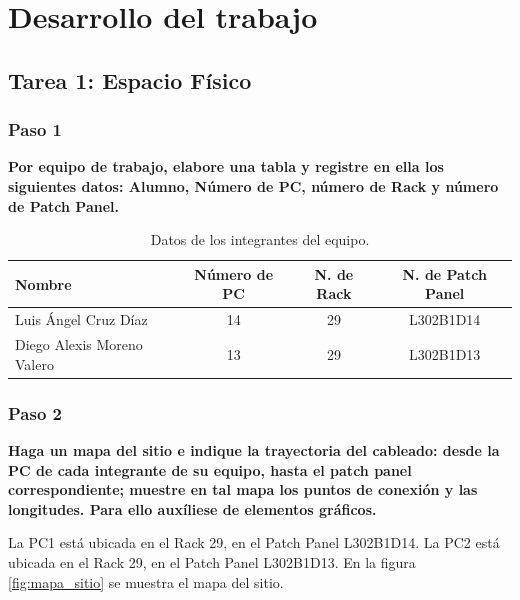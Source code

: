     \newpage
\section{Desarrollo del trabajo}
    \subsection{Tarea 1: Espacio Físico}
        \subsubsection*{Paso 1}
        \textbf{Por equipo de trabajo, elabore una tabla y registre en ella los siguientes datos: Alumno, Número
        de PC, número de Rack y número de Patch Panel.}

        \begin{table}[H]
            \begin{center}
                \begin{tabular}{ l | c | c | c }
                    \textbf{Nombre} & \textbf{Número de PC} & \textbf{N. de Rack} & \textbf{N. de Patch Panel}\\ \hline
                    Luis Ángel Cruz Díaz & 14 & 29 & L302B1D14\\
                    Diego Alexis Moreno Valero & 13 & 29 & L302B1D13
                \end{tabular}
                \caption{Datos de los integrantes del equipo.}
                \label{tab:Datos_Equipo}
                \end{center}
        \end{table}

        \subsubsection*{Paso 2}
        \textbf{Haga un mapa del sitio e indique la trayectoria del cableado: desde la PC de cada integrante de su equipo, hasta el patch panel correspondiente; muestre en tal mapa los puntos de conexión y las longitudes. Para ello auxíliese de elementos gráficos.}

        La PC1 está ubicada en el Rack 29, en el Patch Panel L302B1D14. La PC2 está ubicada en el Rack 29, en el Patch Panel L302B1D13. En la figura \ref{fig:mapa_sitio} se muestra el mapa del sitio.

